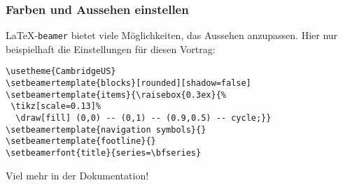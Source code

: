 \begin{frame}[fragile]
  \frametitle{Farben und Aussehen einstellen}

  \onslide<+->

  \LaTeX-\texttt{beamer} bietet viele Möglichkeiten, das Aussehen anzupassen.  Hier nur
  beispielhaft die Einstellungen für diesen Vortrag: \onslide<+->
\begin{lstlisting}
\usetheme{CambridgeUS}
\setbeamertemplate{blocks}[rounded][shadow=false]
\setbeamertemplate{items}{\raisebox{0.3ex}{%
 \tikz[scale=0.13]%
  \draw[fill] (0,0) -- (0,1) -- (0.9,0.5) -- cycle;}}
\setbeamertemplate{navigation symbols}{}
\setbeamertemplate{footline}{}
\setbeamerfont{title}{series=\bfseries}
\end{lstlisting}
  \onslide<+->

  Viel mehr in der Dokumentation!

\end{frame}










